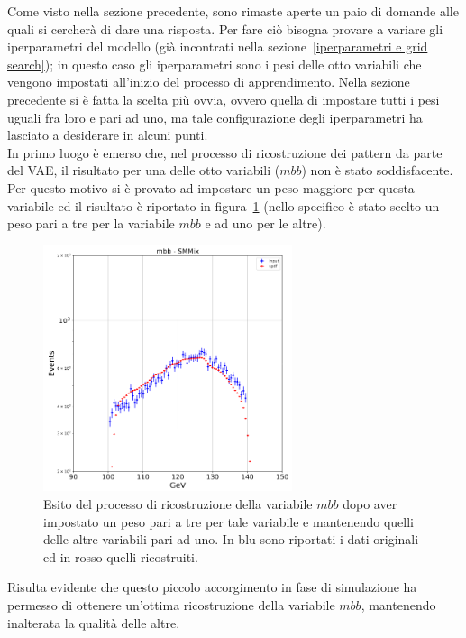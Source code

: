 Come visto nella sezione precedente, sono rimaste aperte un paio di domande alle quali si cercherà di dare una risposta. Per fare ciò bisogna provare a variare gli iperparametri del modello (già incontrati nella sezione~\ref{iperparametri e grid search}); in questo caso gli iperparametri sono i pesi delle otto variabili che vengono impostati all'inizio del processo di apprendimento. Nella sezione precedente si è fatta la scelta più ovvia, ovvero quella di impostare tutti i pesi uguali fra loro e pari ad uno, ma tale configurazione degli iperparametri ha lasciato a desiderare in alcuni punti. \\
In primo luogo è emerso che, nel processo di ricostruzione dei pattern da parte del VAE, il risultato per una delle otto variabili ($\textit{mbb}$) non è stato soddisfacente. Per questo motivo si è provato ad impostare un peso maggiore per questa variabile ed il risultato è riportato in figura~\ref{mbb_ottimizzazione} (nello specifico è stato scelto un peso pari a tre per la variabile $\textit{mbb}$ e ad uno per le altre).

\begin{figure}[h!]
	\centering
	\includegraphics[width=0.65\textwidth]{figs/risultati_simulazione/verifica_mbb.png}
	\caption{Esito del processo di ricostruzione della variabile $\textit{mbb}$ dopo aver impostato un peso pari a tre per tale variabile e mantenendo quelli delle altre variabili pari ad uno. In blu sono riportati i dati originali ed in rosso quelli ricostruiti.}
	\label{mbb_ottimizzazione}
\end{figure}

Risulta evidente che questo piccolo accorgimento in fase di simulazione ha permesso di ottenere un'ottima ricostruzione della variabile $\textit{mbb}$, mantenendo inalterata la qualità delle altre. 

